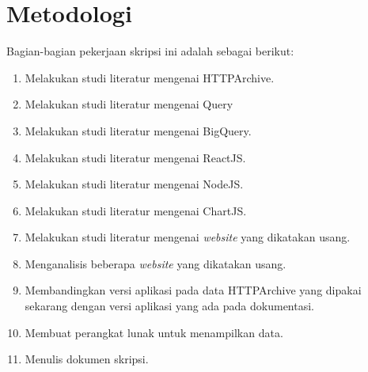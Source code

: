 \section{Metodologi}
\label{sec:metlit}
Bagian-bagian pekerjaan skripsi ini adalah sebagai berikut:
\begin{enumerate}
	\item Melakukan studi literatur mengenai HTTPArchive.
	\item Melakukan studi literatur mengenai Query
	\item Melakukan studi literatur mengenai BigQuery.
	\item Melakukan studi literatur mengenai ReactJS.
	\item Melakukan studi literatur mengenai NodeJS.
	\item Melakukan studi literatur mengenai ChartJS.
	\item Melakukan studi literatur mengenai \textit{website} yang dikatakan usang.
	\item Menganalisis beberapa \textit{website} yang dikatakan usang.
	\item Membandingkan versi aplikasi pada data HTTPArchive yang dipakai sekarang dengan versi aplikasi yang ada pada dokumentasi.
	\item Membuat perangkat lunak untuk menampilkan data.
	\item Menulis dokumen skripsi.
\end{enumerate}


